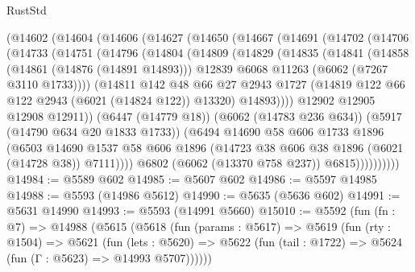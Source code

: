 \begin{lexlean}{RustStd}
\begin{coremodule}
    (@14602
      (@14604
        (@14606
          (@14627
            (@14650
              (@14667
                (@14691
                  (@14702
                    (@14706
                      (@14733
                        (@14751
                          (@14796
                            (@14804
                              (@14809
                                (@14829
                                  (@14835
                                    (@14841
                                      (@14858
                                        (@14861 (@14876 (@14891 @14893)))
                                        @12839
                                        @6068
                                        @11263
                                        (@6062 (@7267 @3110 @1733))))
                                    (@14811
                                      @142
                                      @48
                                      @66
                                      @27
                                      @2943
                                      @1727
                                      (@14819 @122 @66 @122 @2943 (@6021 (@14824 @122)) @13320)
                                      @14893))))
                              @12902
                              @12905
                              @12908
                              @12911))
                          (@6447 (@14779 @18))
                          (@6062 (@14783 @236 @634))
                          (@5917 (@14790 @634 @20 @1833 @1733))
                          (@6494
                            @14690
                            @58
                            @606
                            @1733
                            @1896
                            (@6503
                              @14690
                              @1537
                              @58
                              @606
                              @1896
                              (@14723 @38 @606 @38 @1896 (@6021 (@14728 @38)) @7111))))
                        @6802
                        (@6062 (@13370 @758 @237))
                        @6815))))))))))
@14984 := @5589 @602
@14985 := @5607 @602
@14986 := @5597 @14985
@14988 := @5593 (@14986 @5612)
@14990 := @5635 (@5636 @602)
@14991 := @5631 @14990
@14993 := @5593 (@14991 @5660)
@15010 := @5592
    (fun (fn : @7) =>
    @14988
      (@5615
        (@5618
          (fun (params : @5617) =>
          @5619
            (fun (rty : @1504) =>
            @5621
              (fun (lets : @5620) =>
              @5622 (fun (tail : @1722) => @5624 (fun (Γ : @5623) => @14993 @5707))))))

\end{coremodule}
\end{lexlean}
